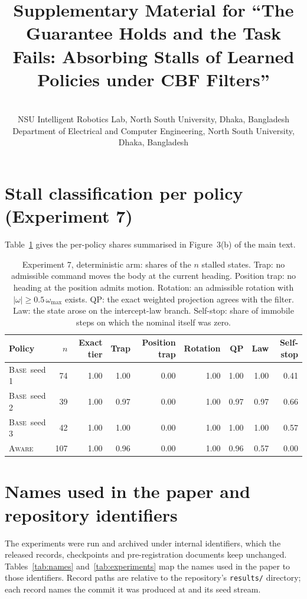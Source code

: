 \documentclass{l4dc2027}
\title[Safe and Stuck: Supplement]{Supplementary Material for ``The Guarantee Holds and the Task Fails: Absorbing Stalls of Learned Policies under CBF Filters''}
\author{%
 \Name{Mohammad Shoaib} \Email{[to confirm]}\\
 \addr NSU Intelligent Robotics Lab, North South University, Dhaka, Bangladesh
 \AND
 \Name{Shahnewaz Siddique} \Email{shahnewaz.siddique@northsouth.edu}\\
 \addr Department of Electrical and Computer Engineering, North South University, Dhaka, Bangladesh%
}
\newcommand{\wmax}{\omega_{\max}}
\newcommand{\Base}{\textsc{Base}}
\newcommand{\Aware}{\textsc{Aware}}
\begin{document}
\maketitle

\section{Stall classification per policy (Experiment 7)}

Table~\ref{tab:b1} gives the per-policy shares summarised in Figure~3(b) of the main text.

\begin{table}[h]
\centering\footnotesize
\caption{Experiment 7, deterministic arm: shares of the $n$ stalled states. Trap: no admissible command moves the body at the current heading. Position trap: no heading at the position admits motion. Rotation: an admissible rotation with $|\omega| \ge 0.5\,\wmax$ exists. QP: the exact weighted projection agrees with the filter. Law: the state arose on the intercept-law branch. Self-stop: share of immobile steps on which the nominal itself was zero.}
\label{tab:b1}
\begin{tabular}{@{}lrrrrrrrr@{}}
\toprule
Policy & $n$ & Exact tier & Trap & Position trap & Rotation & QP & Law & Self-stop \\
\midrule
\Base\ seed 1 & 74 & 1.00 & 1.00 & 0.00 & 1.00 & 1.00 & 1.00 & 0.41 \\
\Base\ seed 2 & 39 & 1.00 & 0.97 & 0.00 & 1.00 & 0.97 & 0.97 & 0.66 \\
\Base\ seed 3 & 42 & 1.00 & 1.00 & 0.00 & 1.00 & 1.00 & 1.00 & 0.57 \\
\Aware & 107 & 1.00 & 0.96 & 0.00 & 1.00 & 0.96 & 0.57 & 0.00 \\
\bottomrule
\end{tabular}
\end{table}

\section{Names used in the paper and repository identifiers}

The experiments were run and archived under internal identifiers, which the released records, checkpoints and pre-registration documents keep unchanged. Tables~\ref{tab:names} and~\ref{tab:experiments} map the names used in the paper to those identifiers. Record paths are relative to the repository's \texttt{results/} directory; each record names the commit it was produced at and its seed stream.
\end{document}
